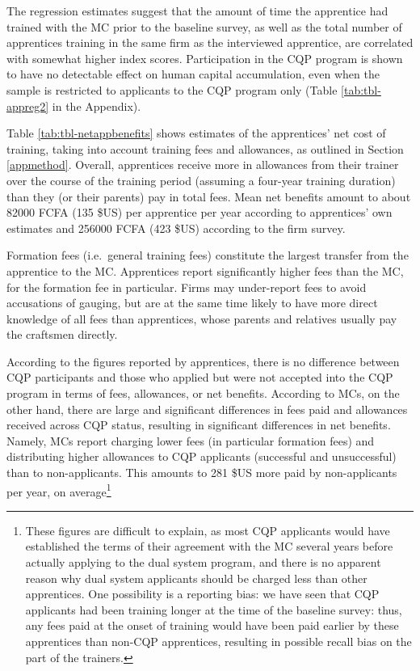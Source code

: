 \documentclass[
  a4paper, twoside, 12pt]{book}
\begin{document}
The regression estimates suggest that the amount of time the apprentice had trained with the MC prior to the baseline survey, as well as the total number of apprentices training in the same firm as the interviewed apprentice, are correlated with somewhat higher index scores. Participation in the CQP program is shown to have no detectable effect on human capital accumulation, even when the sample is restricted to applicants to the CQP program only (Table \ref{tab:tbl-appreg2} in the Appendix).

Table \ref{tab:tbl-netappbenefits} shows estimates of the apprentices' net cost of training, taking into account training fees and allowances, as outlined in Section \ref{appmethod}. Overall, apprentices receive more in allowances from their trainer over the course of the training period (assuming a four-year training duration) than they (or their parents) pay in total fees. Mean net benefits amount to about 82000 FCFA (135 \$US) per apprentice per year according to apprentices' own estimates and 256000 FCFA (423 \$US) according to the firm survey.

Formation fees (i.e.~general training fees) constitute the largest transfer from the apprentice to the MC. Apprentices report significantly higher fees than the MC, for the formation fee in particular. Firms may under-report fees to avoid accusations of gauging, but are at the same time likely to have more direct knowledge of all fees than apprentices, whose parents and relatives usually pay the craftsmen directly.

According to the figures reported by apprentices, there is no difference between CQP participants and those who applied but were not accepted into the CQP program in terms of fees, allowances, or net benefits. According to MCs, on the other hand, there are large and significant differences in fees paid and allowances received across CQP status, resulting in significant differences in net benefits. Namely, MCs report charging lower fees (in particular formation fees) and distributing higher allowances to CQP applicants (successful and unsuccessful) than to non-applicants. This amounts to 281 \$US more paid by non-applicants per year, on average\footnote{These figures are difficult to explain, as most CQP applicants would have established the terms of their agreement with the MC several years before actually applying to the dual system program, and there is no apparent reason why dual system applicants should be charged less than other apprentices. One possibility is a reporting bias: we have seen that CQP applicants had been training longer at the time of the baseline survey: thus, any fees paid at the onset of training would have been paid earlier by these apprentices than non-CQP apprentices, resulting in possible recall bias on the part of the trainers.}
\end{document}

